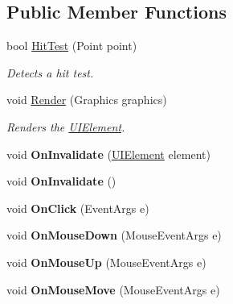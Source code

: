 \subsection*{Public Member Functions}
\begin{DoxyCompactItemize}
\item 
bool \hyperlink{class_msdn_1_1_u_i_framework_1_1_u_i_element_a246fc87022f64df87fe39b0d5d10e396}{HitTest} (Point point)
\begin{DoxyCompactList}\small\item\em Detects a hit test. \item\end{DoxyCompactList}\item 
void \hyperlink{class_msdn_1_1_u_i_framework_1_1_u_i_element_a5a13a9db26f3f4b0ec8dfa11b539df0e}{Render} (Graphics graphics)
\begin{DoxyCompactList}\small\item\em Renders the \hyperlink{class_msdn_1_1_u_i_framework_1_1_u_i_element}{UIElement}. \item\end{DoxyCompactList}\item 
\hypertarget{class_msdn_1_1_u_i_framework_1_1_u_i_element_a55ccc0b5c7e9dd6bd3370efd8b5dae5b}{
void {\bfseries OnInvalidate} (\hyperlink{class_msdn_1_1_u_i_framework_1_1_u_i_element}{UIElement} element)}
\label{class_msdn_1_1_u_i_framework_1_1_u_i_element_a55ccc0b5c7e9dd6bd3370efd8b5dae5b}

\item 
\hypertarget{class_msdn_1_1_u_i_framework_1_1_u_i_element_ab855501c2fefb0341c6b88b1a15c29e5}{
void {\bfseries OnInvalidate} ()}
\label{class_msdn_1_1_u_i_framework_1_1_u_i_element_ab855501c2fefb0341c6b88b1a15c29e5}

\item 
\hypertarget{class_msdn_1_1_u_i_framework_1_1_u_i_element_a0a4208f34ecd23b1742a9d77cd2e0fa6}{
void {\bfseries OnClick} (EventArgs e)}
\label{class_msdn_1_1_u_i_framework_1_1_u_i_element_a0a4208f34ecd23b1742a9d77cd2e0fa6}

\item 
\hypertarget{class_msdn_1_1_u_i_framework_1_1_u_i_element_a2762b95709af1aaf8a1b2d4364caf735}{
void {\bfseries OnMouseDown} (MouseEventArgs e)}
\label{class_msdn_1_1_u_i_framework_1_1_u_i_element_a2762b95709af1aaf8a1b2d4364caf735}

\item 
\hypertarget{class_msdn_1_1_u_i_framework_1_1_u_i_element_ac510e6d510f57dd8f0ef9621b769c43c}{
void {\bfseries OnMouseUp} (MouseEventArgs e)}
\label{class_msdn_1_1_u_i_framework_1_1_u_i_element_ac510e6d510f57dd8f0ef9621b769c43c}

\item 
\hypertarget{class_msdn_1_1_u_i_framework_1_1_u_i_element_a14689b1210f33374e6236054bc2d4701}{
void {\bfseries OnMouseMove} (MouseEventArgs e)}
\label{class_msdn_1_1_u_i_framework_1_1_u_i_element_a14689b1210f33374e6236054bc2d4701}

\end{DoxyCompactItemize}
